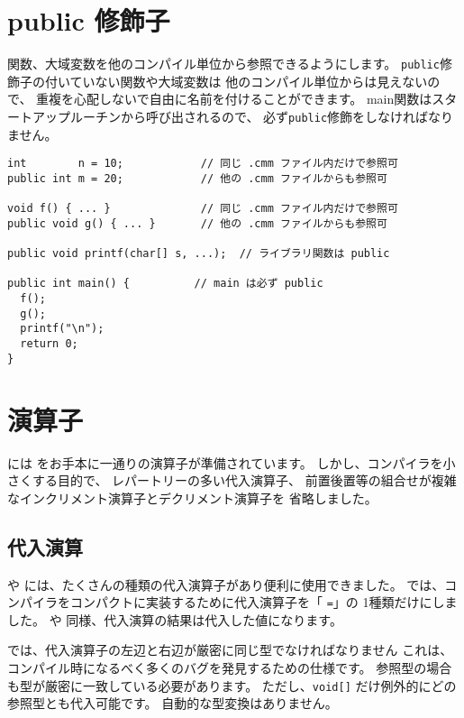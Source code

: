 \section{public 修飾子}

関数、大域変数を他のコンパイル単位から参照できるようにします。
\verb/public/修飾子の付いていない関数や大域変数は
他のコンパイル単位からは見えないので、
重複を心配しないで自由に名前を付けることができます。
main関数はスタートアップルーチンから呼び出されるので、
必ず\verb/public/修飾をしなければなりません。

\begin{mylist}
\begin{verbatim}
int        n = 10;            // 同じ .cmm ファイル内だけで参照可
public int m = 20;            // 他の .cmm ファイルからも参照可

void f() { ... }              // 同じ .cmm ファイル内だけで参照可
public void g() { ... }       // 他の .cmm ファイルからも参照可

public void printf(char[] s, ...);  // ライブラリ関数は public

public int main() {          // main は必ず public
  f();
  g();
  printf("\n");
  return 0;
}
\end{verbatim}
\end{mylist}

\section{演算子}

\cmml には \cl をお手本に一通りの演算子が準備されています。
しかし、コンパイラを小さくする目的で、
レパートリーの多い代入演算子、
前置後置等の組合せが複雑なインクリメント演算子とデクリメント演算子を
省略しました。

\subsection{代入演算}

\cl や \javal には、たくさんの種類の代入演算子があり便利に使用できました。
\cmml では、コンパイラをコンパクトに実装するために代入演算子を「 \verb/=/」の
1種類だけにしました。
\cl や \javal 同様、代入演算の結果は代入した値になります。

\cmml では、代入演算子の左辺と右辺が厳密に同じ型でなければなりません
これは、コンパイル時になるべく多くのバグを発見するための仕様です。
参照型の場合も型が厳密に一致している必要があります。
ただし、\verb/void[]/ だけ例外的にどの参照型とも代入可能です。
自動的な型変換はありません。


